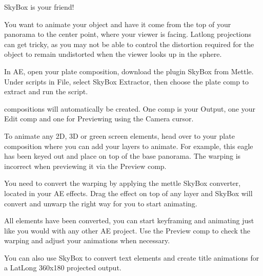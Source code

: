 \begin{fullwidth}
\clearpage
{\large SkyBox is your friend! \par}

You want to animate your object and have it come from the top of your panorama to the center point, where your viewer is facing. Latlong projections can get tricky, as you may not be able to control the distortion required for the object to remain undistorted when the viewer looks up in the sphere.

In AE, open your plate composition, download the plugin SkyBox from Mettle. Under scripts in File, select SkyBox Extractor, then choose the plate comp to extract and run the script.

 compositions will automatically be created. One comp is your Output, one your Edit comp and one for Previewing using the Camera cursor.


To animate any 2D, 3D or green screen elements, head over to your plate composition where you can add your layers to animate. For example, this eagle has been keyed out and place on top of the base panorama. The warping is incorrect when previewing it via the Preview comp. 


You need to convert the warping by applying the mettle SkyBox converter, located in your AE effects. Drag the effect on top of any layer and SkyBox will convert and unwarp the right way for you to start animating. 


All elements have been converted, you can start keyframing and animating just like you would with any other AE project. Use the Preview comp to check the warping and adjust your animations when necessary. 


You can also use SkyBox to convert text elements and create title animations for a LatLong 360x180 projected output.


\clearpage
\end{fullwidth}